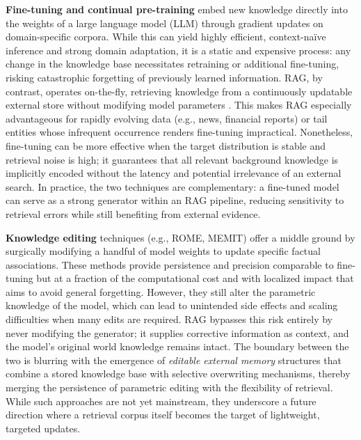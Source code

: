 \documentclass[11pt,a4paper]{article}
\begin{document}
\textbf{Fine-tuning and continual pre-training} embed new knowledge directly into the weights of a large language model (LLM) through gradient updates on domain-specific corpora. While this can yield highly efficient, context-na\"{i}ve inference and strong domain adaptation, it is a static and expensive process: any change in the knowledge base necessitates retraining or additional fine-tuning, risking catastrophic forgetting of previously learned information. RAG, by contrast, operates on-the-fly, retrieving knowledge from a continuously updatable external store without modifying model parameters \cite{arxiv:2312.10997v5}. This makes RAG especially advantageous for rapidly evolving data (e.g., news, financial reports) or tail entities whose infrequent occurrence renders fine-tuning impractical. Nonetheless, fine-tuning can be more effective when the target distribution is stable and retrieval noise is high; it guarantees that all relevant background knowledge is implicitly encoded without the latency and potential irrelevance of an external search. In practice, the two techniques are complementary: a fine-tuned model can serve as a strong generator within an RAG pipeline, reducing sensitivity to retrieval errors while still benefiting from external evidence.

\textbf{Knowledge editing} techniques (e.g., ROME, MEMIT) offer a middle ground by surgically modifying a handful of model weights to update specific factual associations. These methods provide persistence and precision comparable to fine-tuning but at a fraction of the computational cost and with localized impact that aims to avoid general forgetting. However, they still alter the parametric knowledge of the model, which can lead to unintended side effects and scaling difficulties when many edits are required. RAG bypasses this risk entirely by never modifying the generator; it supplies corrective information as context, and the model's original world knowledge remains intact. The boundary between the two is blurring with the emergence of \emph{editable external memory} structures that combine a stored knowledge base with selective overwriting mechanisms, thereby merging the persistence of parametric editing with the flexibility of retrieval. While such approaches are not yet mainstream, they underscore a future direction where a retrieval corpus itself becomes the target of lightweight, targeted updates.
\end{document}
